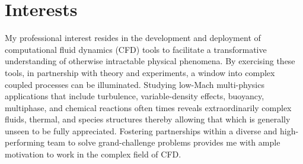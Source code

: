 \documentclass[letterpaper]{twentysecondcv_spd} %
\begin{document}
\pagestyle{headings}
\setcounter{page}{1}



\makeprofile %

\section{Interests}

My professional interest resides in the development and deployment of computational fluid dynamics (CFD) tools to facilitate a transformative understanding of otherwise intractable physical phenomena. By exercising these tools, in partnership with theory and experiments, a window into complex coupled processes can be illuminated. Studying low-Mach multi-physics applications that include turbulence, variable-density effects, buoyancy, multiphase, and chemical reactions often times reveals extraordinarily complex fluids, thermal, and species structures thereby allowing that which is generally unseen to be fully appreciated. Fostering partnerships within a diverse and high-performing team to solve grand-challenge problems provides me with ample motivation to work in the complex field of CFD.

\end{document}
